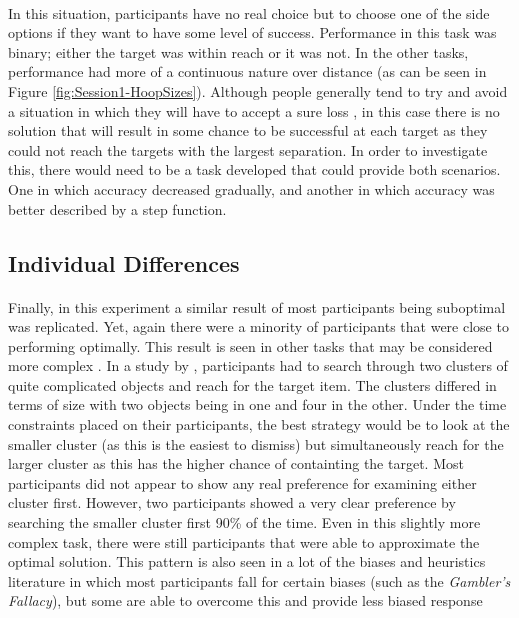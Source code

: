 \documentclass[12pt]{article}
\begin{document}
\paragraph{} In this situation, participants have no real choice but to choose one of the side options if they want to have some level of success. Performance in this task was binary; either the target was within reach or it was not. In the other tasks, performance had more of a continuous nature over distance (as can be seen in Figure \ref{fig:Session1-HoopSizes}). Although people generally tend to try and avoid a situation in which they will have to accept a sure loss \cite{KahnemanProspect}, in this case there is no solution that will result in some chance to be successful at each target as they could not reach the targets with the largest separation. In order to investigate this, there would need to be a task developed that could provide both scenarios. One in which accuracy decreased gradually, and another in which accuracy was better described by a step function. 

\subsection*{Individual Differences}
\paragraph{} Finally, in this experiment a similar result of most participants being suboptimal was replicated. Yet, again there were a minority of participants that were close to performing optimally. This result is seen in other tasks that may be considered more complex \citep{Zhang2012handeye}. In a study by \cite{Zhang2012handeye}, participants had to search through two clusters of quite complicated objects and reach for the target item. The clusters differed in terms of size with two objects being in one and four in the other. Under the time constraints placed on their participants, the best strategy would be to look at the smaller cluster (as this is the easiest to dismiss) but simultaneously reach for the larger cluster as this has the higher chance of containting the target. Most participants did not appear to show any real preference for examining either cluster first. However, two participants showed a very clear preference by searching the smaller cluster first 90\% of the time. Even in this slightly more complex task, there were still participants that were able to approximate the optimal solution. This pattern is also seen in a lot of the biases and heuristics literature in which most participants fall for certain biases (such as the \textit{Gambler's Fallacy}), but some are able to overcome this and provide less biased response \cite{stanovich2008relative}
\end{document}
